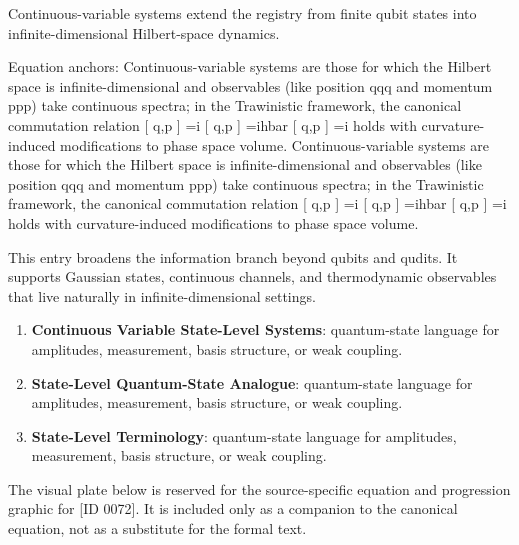 Continuous-variable systems extend the registry from finite qubit states into infinite-dimensional Hilbert-space dynamics.

Equation anchors: Continuous-variable systems are those for which the Hilbert space is infinite-dimensional and observables (like position qqq and momentum ppp) take continuous spectra; in the Trawinistic framework, the canonical commutation relation [ q,p ] =i  [ q,p ] =ihbar [ q,p ] =i  holds with curvature-induced modifications to phase space volume. Continuous-variable systems are those for which the Hilbert space is infinite-dimensional and observables (like position qqq and momentum ppp) take continuous spectra; in the Trawinistic framework, the canonical commutation relation [ q,p ] =i  [ q,p ] =ihbar [ q,p ] =i  holds with curvature-induced modifications to phase space volume.

This entry broadens the information branch beyond qubits and qudits. It supports Gaussian states, continuous channels, and thermodynamic observables that live naturally in infinite-dimensional settings.
\endgroup

\begingroup\footnotesize\sloppy
\begin{enumerate}[leftmargin=1.35em,itemsep=1pt,topsep=1pt,parsep=0pt]
\item \textbf{Continuous Variable State-Level Systems}: quantum-state language for amplitudes, measurement, basis structure, or weak coupling.
\item \textbf{State-Level Quantum-State Analogue}: quantum-state language for amplitudes, measurement, basis structure, or weak coupling.
\item \textbf{State-Level Terminology}: quantum-state language for amplitudes, measurement, basis structure, or weak coupling.
\end{enumerate}
\endgroup

\begingroup\footnotesize\sloppy
The visual plate below is reserved for the source-specific equation and progression graphic for [ID 0072]. It is included only as a companion to the canonical equation, not as a substitute for the formal text.
\par\endgroup
\ifTZPDarkEdition
{}
\fi

